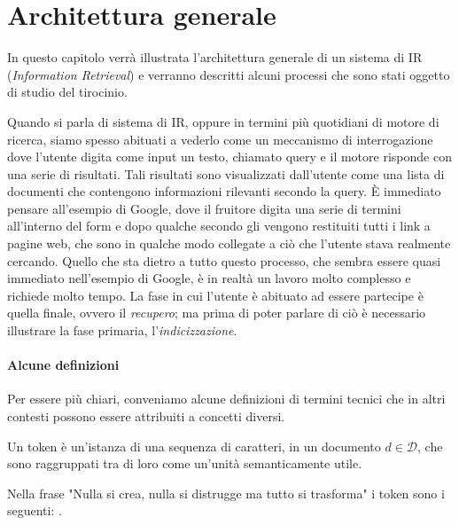 \section{Architettura generale}
In questo capitolo verrà illustrata l'architettura generale di un sistema di IR (\textit{Information Retrieval}) e verranno
descritti alcuni processi che sono stati oggetto di studio del tirocinio.

Quando si parla di sistema di IR, oppure in termini più quotidiani di motore di ricerca,
siamo spesso abituati a vederlo come un meccanismo di interrogazione dove l'utente
digita come input un testo, chiamato query e il motore risponde con una serie di risultati. Tali risultati
sono visualizzati dall'utente come una lista di documenti che contengono informazioni
rilevanti secondo la query.
\`E immediato pensare all'esempio di Google, dove il fruitore digita una serie di termini
all'interno del  form e dopo qualche secondo gli vengono restituiti tutti i link a pagine web, che
sono in qualche modo collegate a ciò che l'utente stava realmente cercando.
Quello che sta dietro a tutto questo processo, che sembra essere quasi immediato nell'esempio di Google, è
in realtà un lavoro molto complesso e richiede molto tempo.
La fase in cui l'utente è abituato ad essere partecipe è quella finale, ovvero
il \textit{recupero}; ma prima di poter parlare di ciò è necessario illustrare la fase primaria, l'\textit{indicizzazione}.

\paragraph{Alcune definizioni}
Per essere più chiari, conveniamo alcune definizioni di termini tecnici che in altri contesti possono essere attribuiti
a concetti diversi.

\begin{definizione}\label{def:token}
	Un token è un'istanza di una sequenza di caratteri, in un documento $d \in \mathcal{D}$, che
	sono raggruppati tra di loro come un'unità semanticamente utile.
\end{definizione}

\begin{esempio}[tokenizzazione]
	Nella frase "Nulla si crea, nulla si distrugge ma tutto si trasforma" i token sono i seguenti:
	     
	   .
\end{esempio}

